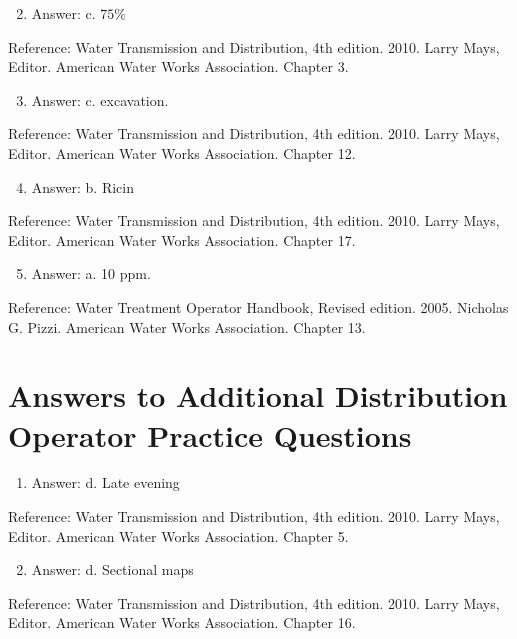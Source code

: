 \documentclass[10pt]{article}
\begin{document}
\begin{enumerate}
  \setcounter{enumi}{1}
  \item Answer: c. $75 \%$
\end{enumerate}

Reference: Water Transmission and Distribution, 4th edition. 2010. Larry Mays, Editor. American Water Works Association. Chapter 3.

\begin{enumerate}
  \setcounter{enumi}{2}
  \item Answer: c. excavation.
\end{enumerate}

Reference: Water Transmission and Distribution, 4th edition. 2010. Larry Mays, Editor. American Water Works Association. Chapter 12.

\begin{enumerate}
  \setcounter{enumi}{3}
  \item Answer: b. Ricin
\end{enumerate}

Reference: Water Transmission and Distribution, 4th edition. 2010. Larry Mays, Editor. American Water Works Association. Chapter 17.

\begin{enumerate}
  \setcounter{enumi}{4}
  \item Answer: a. 10 ppm.
\end{enumerate}

Reference: Water Treatment Operator Handbook, Revised edition. 2005. Nicholas G. Pizzi. American Water Works Association. Chapter 13.

\section{Answers to Additional Distribution Operator Practice Questions}
\begin{enumerate}
  \item Answer: d. Late evening
\end{enumerate}

Reference: Water Transmission and Distribution, 4th edition. 2010. Larry Mays, Editor. American Water Works Association. Chapter 5.

\begin{enumerate}
  \setcounter{enumi}{1}
  \item Answer: d. Sectional maps
\end{enumerate}

Reference: Water Transmission and Distribution, 4th edition. 2010. Larry Mays, Editor. American Water Works Association. Chapter 16.
\end{document}

